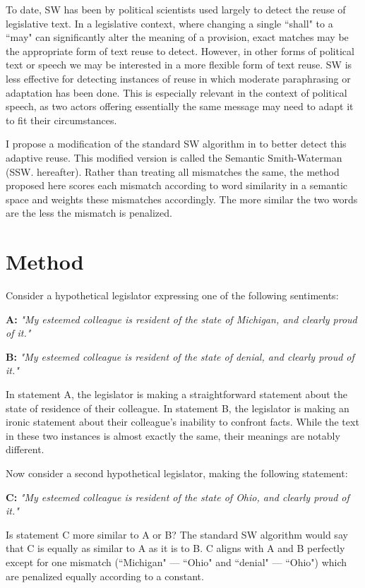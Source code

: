 {To date, SW has been by political scientists used largely to detect the reuse of legislative text. In a legislative context, where changing a single ``shall" to a ``may" can significantly alter the meaning of a provision, exact matches may be the appropriate form of text reuse to detect. However, in other forms of political text or speech we may be interested in a more flexible form of text reuse. SW is less effective for detecting instances of reuse in which moderate paraphrasing or adaptation has been done. This is especially relevant in the context of political speech, as two actors offering essentially the same message may need to adapt it to fit their circumstances. 

I propose a modification of the standard SW algorithm in to better detect this adaptive reuse. This modified version is called the Semantic Smith-Waterman (SSW. hereafter). Rather than treating all mismatches the same, the method proposed here scores each mismatch according to word similarity in a semantic space and weights these mismatches accordingly. The more similar the two words are the less the mismatch is penalized.  

\section{Method}


Consider a hypothetical legislator expressing  one of the following sentiments:

\textbf{A:} \emph{"My esteemed colleague is resident of the state of Michigan, and clearly proud of it."}
 
\textbf{B:} \emph{"My esteemed colleague is resident of the state of denial, and clearly proud of it."}
 
In statement A, the legislator is making a straightforward statement about the state of residence of their colleague. In statement B, the legislator is making an ironic statement about their colleague's inability to confront facts. While the text in these two instances is almost exactly the same, their meanings are notably different. 

Now consider a second hypothetical legislator, making the following statement: 

\textbf{C:} \emph{"My esteemed colleague is resident of the state of Ohio, and clearly proud of it."}

Is statement C more similar to A or B? The standard SW algorithm would say that C is equally as similar to A as it is to B. C aligns with A and B perfectly except for one mismatch (``Michigan" --- ``Ohio" and ``denial" --- ``Ohio") which are penalized equally according to a constant.

}
